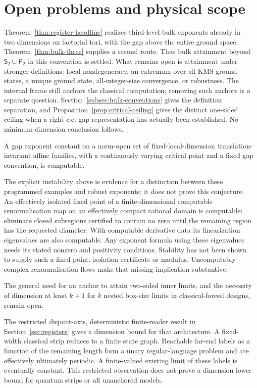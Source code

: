\section{Open problems and physical scope}\label{sec:scope}
Theorem~\ref{thm:register-headline} realizes third-level bulk exponents
already in two dimensions on factorial tori, with the gap above the
entire ground space. Theorem~\ref{thm:bulk-three} supplies a second route. Thus bulk
attainment beyond $\mathsf S_2\cup\mathsf P_2$ in this convention is
settled. What remains open is attainment under stronger definitions:
local nondegeneracy, an extremum over all KMS ground states, a unique
ground state, all-integer-size convergence, or robustness. The internal
frame still anchors the classical computation; removing such anchors is
a separate question. Section~\ref{subsec:bulk-conventions} gives the
definition separation, and Proposition~\ref{prop:critical-ceiling} gives
the distinct one-sided ceiling when a right-c.e. gap representation
has actually been established. No minimum-dimension conclusion follows.

\begin{conjecture}
A gap exponent constant on a norm-open set of fixed-local-dimension
translation-invariant affine families, with a continuously varying
critical point and a fixed gap convention, is computable.
\end{conjecture}
The explicit instability above is evidence for a distinction between
these programmed examples and robust exponents; it does not prove
this conjecture. An effectively isolated fixed point of a finite-dimensional
computable renormalisation map on an effectively compact rational domain is
computable: eliminate closed subregions certified to contain no
zero until the remaining region has the requested diameter. With
computable derivative data its linearization eigenvalues are also
computable. Any exponent formula using these eigenvalues needs
its stated nonzero and positivity conditions. Stability has not been shown to supply such a fixed
point, isolation certificate or modulus. Uncomputably complex
renormalisation flows \cite{renormalisation} make that missing
implication substantive.

\begin{conjecture}
The general need for an anchor to attain two-sided inner limits,
and the necessity of dimension at least $k+1$ for $k$ nested
box-size limits in classical-forced designs, remain open.
\end{conjecture}
The restricted disjoint-axis, deterministic finite-reader result in
Section~\ref{sec:registers} gives a dimension bound for that architecture.
A fixed-width classical strip reduces to a finite state graph.
Reachable far-end labels as a function of the remaining length form
a unary regular-language problem and are effectively ultimately
periodic. A finite-valued existing limit of these labels is
eventually constant. This restricted observation does not prove a
dimension lower bound for quantum strips or all unanchored models.

